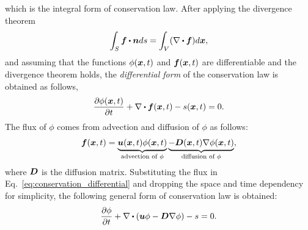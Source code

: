 which is the integral form of conservation law. After applying the divergence theorem 
\begin{equation}
\int_{{S}} \vect{f} \bigcdot \vect{n} ds=
\int_{{V}} (\nabla \bigcdot \vect{f})   d{\vect{x}},
\label{eq:divergence_theo}
\end{equation}
and assuming that the functions $\phi(\boldsymbol{x},t)$ and $\boldsymbol{f}(\boldsymbol{x},t)$ are differentiable and the divergence theorem holds, the \textit{differential form} of the conservation law is obtained as follows,
\begin{align}
\frac{\partial \phi (\vect{x},t) }{\partial t}  +
\nabla \bigcdot \vect{f}(\vect {x},t) 
-
s(\vect{x},t)=0.
\label{eq:conservation_differential}
\end{align}
The flux of $\phi$ comes from advection and diffusion of $\phi$ as follows:
\begin{align}
\boldsymbol{f}(\boldsymbol{x},t)=
\underbrace{\boldsymbol{u}(\boldsymbol{x},t) \phi(\boldsymbol{x},t)}_{\text{advection of $\phi$}} 
\underbrace{- \boldsymbol{D}(\boldsymbol{x},t) \nabla\phi(\boldsymbol{x},t)}_{\text{diffusion of $\phi$}},
\label{eq:Flux}
\end{align} 
where $\boldsymbol{D}$ is the diffusion matrix. Substituting the flux in Eq.~\ref{eq:conservation_differential} and dropping the space and time dependency for simplicity, the following general form of conservation law is obtained:
\begin{align}
\frac{\partial \phi  }{\partial t}  + \nabla \bigcdot (\vect{u} \phi - \vect{D}  \nabla \phi) -s=0.
\label{eq:transport_simple}
\end{align}


